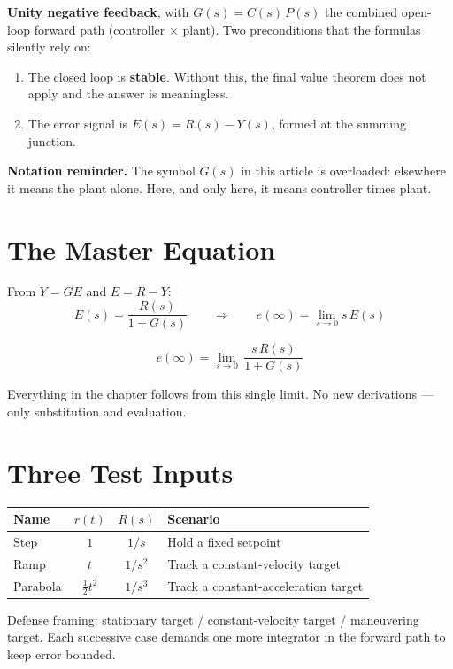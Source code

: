 \documentclass[11pt]{article}
\begin{document}
\textbf{Unity negative feedback}, with $G(s) = C(s)\,P(s)$ the combined
open-loop forward path (controller $\times$ plant).  Two preconditions
that the formulas silently rely on:

\begin{enumerate}
  \item The closed loop is \textbf{stable}.  Without this, the final value
    theorem does not apply and the answer is meaningless.
  \item The error signal is $E(s) = R(s) - Y(s)$, formed at the summing
    junction.
\end{enumerate}

\textbf{Notation reminder.}  The symbol $G(s)$ in this article is overloaded:
elsewhere it means the plant alone.  Here, and only here, it means controller
times plant.

\section*{The Master Equation}

From $Y = GE$ and $E = R - Y$:
\[
  E(s) = \frac{R(s)}{1+G(s)}
  \qquad\Longrightarrow\qquad
  e(\infty) = \lim_{s\to 0} s\,E(s)
\]

\[
  \boxed{\;e(\infty) = \lim_{s\to 0}\,\frac{s\,R(s)}{1+G(s)}\;}
\]

Everything in the chapter follows from this single limit.  No new
derivations --- only substitution and evaluation.

\section*{Three Test Inputs}

\begin{center}
\begin{tabular}{lccl}
\toprule
Name      & $r(t)$            & $R(s)$  & Scenario \\
\midrule
Step      & $1$               & $1/s$   & Hold a fixed setpoint \\
Ramp      & $t$               & $1/s^2$ & Track a constant-velocity target \\
Parabola  & $\tfrac12 t^2$    & $1/s^3$ & Track a constant-acceleration target \\
\bottomrule
\end{tabular}
\end{center}

Defense framing: stationary target / constant-velocity target / maneuvering
target.  Each successive case demands one more integrator in the forward
path to keep error bounded.
\end{document}
